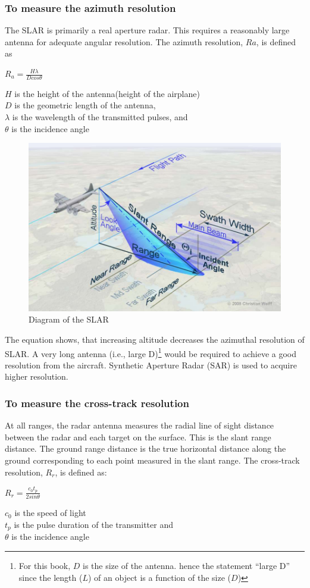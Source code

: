 \subsubsection*{To measure the azimuth resolution}
The SLAR is primarily a real aperture radar. This requires a reasonably large antenna for adequate angular resolution. The azimuth resolution, $ Ra $, is defined as

\begin{center}
$R_{a}=\frac{H \lambda}{D cos\theta}$
\end{center}
$ H $ is the height of the antenna(height of the airplane)\\
$ D $ is the geometric length of the antenna,\\
$\lambda$ is the wavelength of the transmitted pulses, and\\
$\theta$ is the incidence angle

\begin{figure}[h]
\centering
\includegraphics[width=.8\linewidth]{./graphics/SLAR2}
\caption{Diagram of the SLAR}
\label{fig:slar2}
\end{figure}

The equation shows, that increasing altitude decreases the azimuthal resolution of SLAR. A very long antenna (i.e., large D)\footnote{For this book, $D$ is the size of the antenna. hence the statement \textquotedblleft large D\textquotedblright\; since the length ($L$) of an object is a function of the size ($D$)} would be required to achieve a good resolution from the aircraft. Synthetic Aperture Radar (SAR) is used to acquire higher resolution.

\subsubsection{To measure the cross-track resolution}
At all ranges, the radar antenna measures the radial line of sight distance between the radar and each target on the surface. This is the slant range distance. The ground range distance is the true horizontal distance along the ground corresponding to each point measured in the slant range. The cross-track resolution, $R_{r}$, is defined as:  
\begin{center}
$R_{r}=\frac{c_{0} t_{p}}{2 sin\theta}$
\end{center}
$c_{0}$ is the speed of light\\
$t_{p}$ is the pulse duration of the transmitter and\\
$\theta$ is the incidence angle

